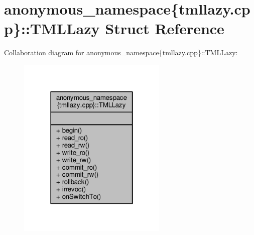 \hypertarget{structanonymous__namespace_02tmllazy_8cpp_03_1_1TMLLazy}{\section{anonymous\-\_\-namespace\{tmllazy.\-cpp\}\-:\-:T\-M\-L\-Lazy Struct Reference}
\label{structanonymous__namespace_02tmllazy_8cpp_03_1_1TMLLazy}
}


Collaboration diagram for anonymous\-\_\-namespace\{tmllazy.\-cpp\}\-:\-:T\-M\-L\-Lazy\-:
\nopagebreak
\begin{figure}[H]
\begin{center}
\leavevmode
\includegraphics[width=202pt]{structanonymous__namespace_02tmllazy_8cpp_03_1_1TMLLazy__coll__graph}
\end{center}
\end{figure}
